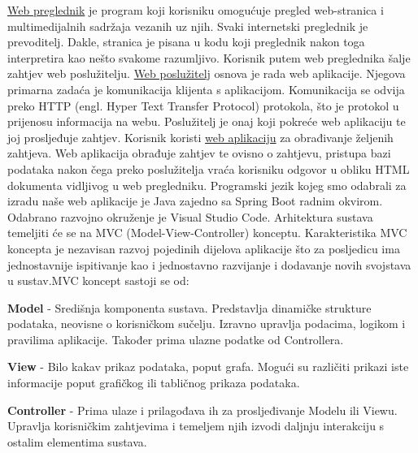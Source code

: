 \underline{Web preglednik} je program koji korisniku omogućuje pregled web-stranica i multimedijalnih sadržaja
vezanih uz njih. Svaki internetski preglednik je prevoditelj. Dakle, stranica je pisana u kodu koji
preglednik nakon toga interpretira kao nešto svakome razumljivo. Korisnik putem web preglednika šalje
zahtjev web poslužitelju.
\newline \underline{Web poslužitelj} osnova je rada web aplikacije. Njegova primarna zadaća je komunikacija klijenta s aplikacijom.
Komunikacija se odvija preko HTTP (engl. Hyper Text Transfer Protocol) protokola, što je protokol u prijenosu
informacija na webu. Poslužitelj je onaj koji pokreće web aplikaciju te joj prosljeđuje zahtjev. \newline Korisnik koristi
\underline{web aplikaciju} za obrađivanje željenih zahtjeva. Web aplikacija obrađuje zahtjev te ovisno o zahtjevu, pristupa
bazi podataka nakon čega preko poslužitelja vraća korisniku odgovor u obliku HTML dokumenta vidljivog u web pregledniku. \newline
\newline Programski jezik kojeg smo odabrali za izradu naše web aplikacije je Java zajedno sa Spring Boot radnim okvirom. Odabrano razvojno okruženje je Visual Studio Code.
Arhitektura sustava temeljiti će se na MVC (Model-View-Controller) konceptu. \newline
Karakteristika MVC koncepta je nezavisan razvoj pojedinih dijelova aplikacije što za posljedicu ima jednostavnije
ispitivanje kao i jednostavno razvijanje i dodavanje novih svojstava u sustav.\newline MVC koncept sastoji se od:
\begin{packed_item}
	\item \textbf{Model} - Središnja komponenta sustava. Predstavlja dinamičke strukture podataka, neovisne
	o korisničkom sučelju. Izravno upravlja podacima, logikom i pravilima aplikacije. Također prima ulazne podatke od Controllera.
	\item \textbf{View} - Bilo kakav prikaz podataka, poput grafa. Mogući su različiti prikazi iste informacije poput
	grafičkog ili tabličnog prikaza podataka.
	\item \textbf{Controller} - Prima ulaze i prilagođava ih za prosljeđivanje Modelu ili Viewu. Upravlja
	korisničkim zahtjevima i temeljem njih izvodi daljnju interakciju s ostalim elementima sustava.
\end{packed_item}

\newpage



